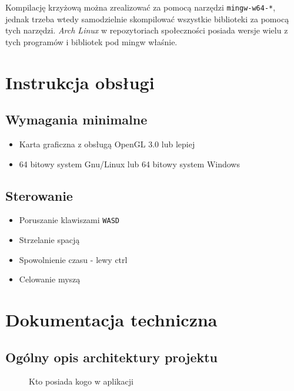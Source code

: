 \documentclass[a4paper,11pt]{article}
\begin{document}
Kompilację krzyżową można zrealizować za pomocą narzędzi \texttt{mingw-w64-*}, jednak trzeba wtedy samodzielnie skompilować wszystkie biblioteki za pomocą tych narzędzi. \emph{Arch Linux} w repozytoriach społeczności posiada wersje wielu z tych programów i bibliotek pod mingw właśnie.

\section{Instrukcja obsługi}

\subsection*{Wymagania minimalne}

\begin{itemize}
    \item Karta graficzna z obsługą OpenGL 3.0 lub lepiej
    \item 64 bitowy system Gnu/Linux lub 64 bitowy system Windows
\end{itemize}

\subsection*{Sterowanie}

\begin{itemize}
    \item Poruszanie klawiszami \texttt{WASD}
    \item Strzelanie spacją
    \item Spowolnienie czasu - lewy ctrl
    \item Celowanie myszą
\end{itemize}

\section{Dokumentacja techniczna}

\subsection{Ogólny opis architektury projektu}

\begin{figure}[h]
    \resizebox{\textwidth}{!}{%
    }
    \centering
    \caption{Kto posiada kogo w aplikacji}
\end{figure}
\end{document}
